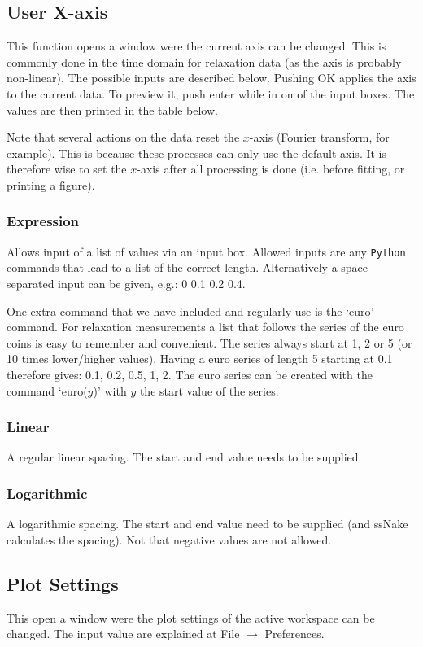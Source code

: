 \documentclass[11pt,a4paper]{article}
\begin{document}
\subsection{User X-axis}
This function opens a window were the current axis can be changed. This is commonly done in the time domain
for relaxation data (as the axis is probably non-linear). The possible inputs are described below. Pushing OK
applies the axis to the current data. To preview it, push enter while in on of the input boxes. The values are
then printed in the table below.

Note that several actions on the data reset the $x$-axis (Fourier transform, for example). This is because
these processes can only use the default axis. It is therefore wise to set the $x$-axis after all processing is
done (i.e. before fitting, or printing a figure).

\subsubsection{Expression}
Allows input of a list of values via an input box. Allowed inputs are any \texttt{Python} commands that lead
to a list of the correct length. Alternatively a space separated input can be given, e.g.: 0 0.1 0.2 0.4.

One extra command that we have included and regularly use is the `euro' command. For relaxation measurements a
list that follows the series of the euro coins is easy to remember and convenient. The series always start at
1, 2 or 5 (or 10 times lower/higher values). Having a euro series of length 5 starting at 0.1 therefore gives:
0.1, 0.2, 0.5, 1, 2. The euro series can be created with the command `euro($y$)' with $y$ the start value of
the series.



\subsubsection{Linear}
A regular linear spacing. The start and end value needs to be supplied.

\subsubsection{Logarithmic}
A logarithmic spacing. The start and end value need to be supplied (and ssNake calculates the spacing). Not
that negative values are not allowed.

\subsection{Plot Settings}
This open a window were the plot settings of the active workspace can be changed. The input value are explained
at File $\rightarrow$ Preferences.
\end{document}
